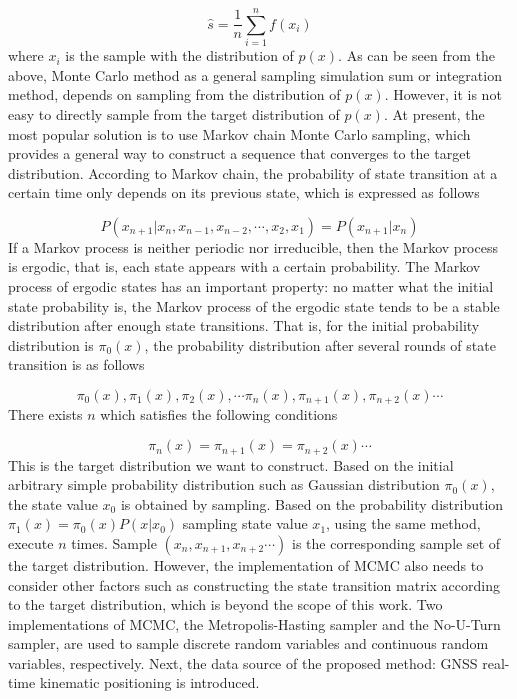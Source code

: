 \documentclass[journal]{IEEEtran}
\begin{document}
\begin{equation}\label{eq_monte_carlo_3}
\hat s = \frac{1}{n}\sum\limits_{i = 1}^n {f({x_i})}
\end{equation}
where $x_i$ is the sample with the distribution of $p(x)$. As can be seen from the above, Monte Carlo method as a general sampling simulation sum or integration method, depends on sampling from the distribution of $p(x)$. However, it is not easy to directly sample from the target distribution of $p(x)$. At present, the most popular solution is to use Markov chain Monte Carlo sampling, which provides a general way to construct a sequence that converges to the target distribution. According to Markov chain, the probability of state transition at a certain time only depends on its previous state, which is expressed as follows\cite{robert2013monte}

\begin{equation}\label{eq_markov_chain_1}
P({x_{n + 1}}\left| {{x_n},{x_{n - 1}}} \right.,{x_{n - 2}}, \cdots ,{x_2},{x_1}) = P({x_{n + 1}}\left| {{x_n}} \right.)
\end{equation}
If a Markov process is neither periodic nor irreducible, then the Markov process is ergodic, that is, each state appears with a certain probability. The Markov process of ergodic states has an important property: no matter what the initial state probability is, the Markov process of the ergodic state tends to be a stable distribution after enough state transitions\cite{robert2013monte}.
That is, for the initial probability distribution is $\pi_0(x)$, the probability distribution after several rounds of state transition is as follows

\begin{equation}\label{eq_markov_chain_2}
\pi_{0}(x),\pi_{1}(x),\pi_{2}(x),\cdots \pi_{n}(x),\pi_{n+1}(x),\pi_{n+2}(x)\cdots
\end{equation}
There exists $n$ which satisfies the following conditions

\begin{equation}\label{eq_markov_chain_3}
\pi_{n}(x)=\pi_{n+1}(x)=\pi_{n+2}(x)\cdots
\end{equation}
This is the target distribution we want to construct. Based on the initial arbitrary simple probability distribution such as Gaussian distribution $\pi_{0}(x)$, the state value $x_0$ is obtained by sampling. Based on the probability distribution $\pi_{1}(x)=\pi_{0}(x)P(x\left| {{x_0}} \right.)$ sampling state value $x_1$, using the same method, execute $n$ times. Sample $(x_{n},x_{n+1},x_{n+2}\cdots)$ is the corresponding sample set of the target distribution. However, the implementation of MCMC also needs to consider other factors such as constructing the state transition matrix according to the target distribution\cite{robert2013monte}, which is beyond the scope of this work. Two implementations of MCMC,  the Metropolis-Hasting sampler\cite{chib1995understanding} and the No-U-Turn sampler\cite{hoffman2014no}, are used to sample discrete random variables and continuous random variables, respectively. Next, the data source of the proposed method: GNSS real-time kinematic positioning is introduced.
\end{document}

